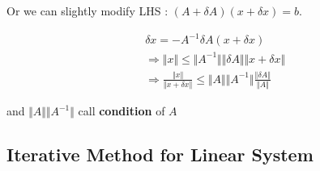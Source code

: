 Or we can slightly modify LHS :
$(A + \delta A)(x + \delta x) = b$.

\begin{align}
  &\delta x = -A^{-1}\delta A(x + \delta x) \nonumber \\
  &\Rightarrow \Vert x \Vert \leq
    \Vert A^{-1} \Vert \Vert \delta A \Vert \Vert x + \delta x \Vert \nonumber \\
  &\Rightarrow \frac{\Vert x \Vert}{\Vert x + \delta x \Vert} \leq
    \Vert A \Vert \Vert A^{-1} \Vert \frac{\Vert \delta A \Vert}{\Vert A \Vert} \nonumber
\end{align}

and $\Vert A \Vert \Vert A^{-1} \Vert$ call \textbf{condition} of $A$

\subsection{Iterative Method for Linear System}
